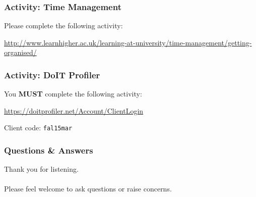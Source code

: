 
\begin{frame}
	\frametitle{Activity: Time Management}
	
	Please complete the following activity:
	
	\vspace{2em}
	
	\url{http://www.learnhigher.ac.uk/learning-at-university/time-management/getting-organised/}

\end{frame}

\begin{frame}
	\frametitle{Activity: DoIT Profiler}
	
	You \textbf{MUST} complete the following activity:
	
	\vspace{2em}
	
	\url{https://doitprofiler.net/Account/ClientLogin}
	
	\vspace{2em}
	
	Client code: \texttt{fal15mar}

\end{frame}

\begin{frame}
	\frametitle{Questions \& Answers}	
	\begin{center}
		Thank you for listening. 
		\\~\\
		Please feel welcome to ask questions or raise concerns.
	\end{center}
\end{frame}


